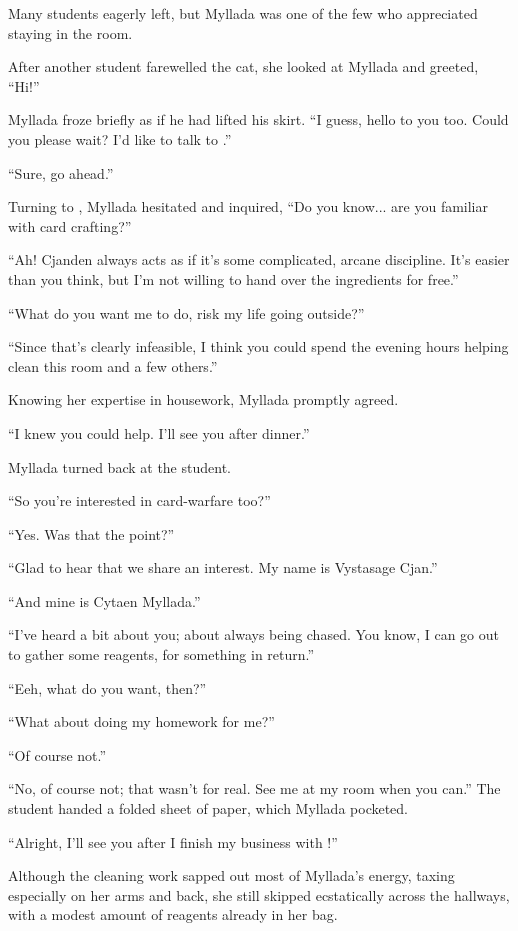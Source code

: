 \centeredstars

Many students eagerly left, but Myllada was one of the few who appreciated staying in the room.

After another student farewelled the cat, she looked at Myllada and greeted, ``Hi!''

Myllada froze briefly as if he had lifted his skirt. ``I guess, hello to you too. Could you please wait? I'd like to talk to \yronsyncra.''

``Sure, go ahead.''

Turning to \yronsyncra, Myllada hesitated and inquired, ``Do you know... are you familiar with card crafting?''

``Ah! Cjanden always acts as if it's some complicated, arcane discipline. It's easier than you think, but I'm not willing to hand over the ingredients for free.''

``What do you want me to do, risk my life going outside?''

``Since that's clearly infeasible, I think you could spend the evening hours helping clean this room and a few others.''

Knowing her expertise in housework, Myllada promptly agreed.

``I knew you could help. I'll see you after dinner.''

Myllada turned back at the student.

``So you're interested in card-warfare too?''

``Yes. Was that the point?''

``Glad to hear that we share an interest. My name is Vystasage Cjan.''

``And mine is Cytaen Myllada.''

``I've heard a bit about you; about always being chased. You know, I can go out to gather some reagents, for something in return.''

``Eeh, what do you want, then?''

``What about doing my homework for me?''

``Of course not.''

``No, of course not; that wasn't for real. See me at my room when you can.'' The student handed a folded sheet of paper, which Myllada pocketed.

``Alright, I'll see you after I finish my business with \yronsyncra!''

\centeredstars

Although the cleaning work sapped out most of Myllada's energy, taxing especially on her arms and back, she still skipped ecstatically across the hallways, with a modest amount of reagents already in her bag.


